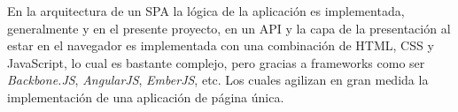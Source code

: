 

En la arquitectura de un SPA la lógica de la aplicación es implementada, generalmente y en el presente proyecto, en un API y la capa de la presentación al estar en el navegador es implementada con una combinación de HTML, CSS y JavaScript, lo cual es bastante complejo, pero gracias a frameworks como ser \emph{Backbone.JS}, \emph{AngularJS}, \emph{EmberJS}, etc. Los cuales agilizan en gran medida la implementación de una aplicación de página única.\\








%
%
%
%
%

